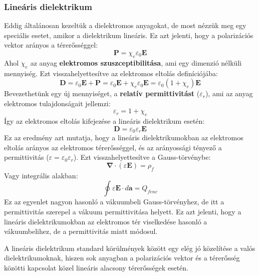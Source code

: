 \documentclass[../main.tex]{subfiles}
\begin{document}
\subsubsection{Lineáris dielektrikum}
Eddig általánosan kezeltük a dielektromos anyagokat, de most nézzük meg egy speciális esetet, amikor a dielektrikum lineáris. Ez azt jelenti, hogy a polarizációs vektor
arányos a térerősséggel:
\begin{equation}
    \mathbf{P} = \chi_e \varepsilon_0 \mathbf{E}
\end{equation}
Ahol $\chi_e$ az anyag \textbf{elektromos szuszceptibilitása}, ami egy dimenzió nélküli mennyiség. Ezt visszahelyettesítve az elektromos eltolás definíciójába:
\begin{equation}
    \mathbf{D} = \varepsilon_0 \mathbf{E} + \mathbf{P} = \varepsilon_0 \mathbf{E} + \chi_e \varepsilon_0 \mathbf{E} = \varepsilon_0 (1 + \chi_e) \mathbf{E}
\end{equation}
Bevezethetünk egy új mennyiséget, a \textbf{relatív permittivitást} ($\varepsilon_r$), ami az anyag elektromos tulajdonságait jellemzi:
\begin{equation}
    \varepsilon_r = 1 + \chi_e
\end{equation}
Így az elektromos eltolás kifejezése a lineáris dielektrikum esetén:
\begin{equation}
    \mathbf{D} = \varepsilon_0 \varepsilon_r \mathbf{E}
\end{equation}
Ez az eredmény azt mutatja, hogy a lineáris dielektrikumokban az elektromos eltolás arányos az elektromos térerősséggel, és az arányossági tényező a permittivitás ($\varepsilon = \varepsilon_0 \varepsilon_r$).
Ezt visszahelyettesítve a Gauss-törvénybe:
\begin{equation}
    \boldsymbol{\nabla} \cdot (\varepsilon \mathbf{E}) = \rho_f
\end{equation}
Vagy integrális alakban:
\begin{equation}
    \oint \varepsilon \mathbf{E} \cdot d\mathbf{a} = Q_{fenc}
\end{equation}
Ez az egyenlet nagyon hasonló a vákuumbeli Gauss-törvényhez, de itt a permittivitás szerepel a vákuum permittivitása helyett. Ez azt jelenti, hogy a lineáris dielektrikumokban az elektromos tér viselkedése hasonló a vákuumbelihez, de a permittivitás miatt módosul.

A lineáris dielektrikum standard körülmények között egy elég jó közelítése a valós dielektrikumoknak, hiszen sok anyagban a polarizációs vektor és a térerősség közötti kapcsolat közel lineáris alacsony térerősségek esetén.
\end{document}

